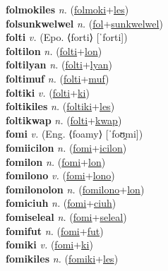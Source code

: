 \textbf{folmokiles} \textit{n.} (\hyperref[folmoki]{folmoki}+\hyperref[les]{les})
 \label{folmokiles} \\
\textbf{folsunkwelwel} \textit{n.} (\hyperref[fol]{fol}+\hyperref[sunkwelwel]{sunkwelwel})
 \label{folsunkwelwel} \\
\textbf{folti} \textit{v.} (Epo. ⟨forti⟩ [ˈforti])
 \label{folti} \\
\textbf{foltilon} \textit{n.} (\hyperref[folti]{folti}+\hyperref[lon]{lon})
 \label{foltilon} \\
\textbf{foltilyan} \textit{n.} (\hyperref[folti]{folti}+\hyperref[lyan]{lyan})
 \label{foltilyan} \\
\textbf{foltimuf} \textit{n.} (\hyperref[folti]{folti}+\hyperref[muf]{muf})
 \label{foltimuf} \\
\textbf{foltiki} \textit{v.} (\hyperref[folti]{folti}+\hyperref[ki]{ki})
 \label{foltiki} \\
\textbf{foltikiles} \textit{n.} (\hyperref[foltiki]{foltiki}+\hyperref[les]{les})
 \label{foltikiles} \\
\textbf{foltikwap} \textit{n.} (\hyperref[folti]{folti}+\hyperref[kwap]{kwap})
 \label{foltikwap} \\
\textbf{fomi} \textit{v.} (Eng. ⟨foamy⟩ [ˈfoʊ̯mi])
 \label{fomi} \\
\textbf{fomiicilon} \textit{n.} (\hyperref[fomi]{fomi}+\hyperref[icilon]{icilon})
 \label{fomiicilon} \\
\textbf{fomilon} \textit{n.} (\hyperref[fomi]{fomi}+\hyperref[lon]{lon})
 \label{fomilon} \\
\textbf{fomilono} \textit{v.} (\hyperref[fomi]{fomi}+\hyperref[lono]{lono})
 \label{fomilono} \\
\textbf{fomilonolon} \textit{n.} (\hyperref[fomilono]{fomilono}+\hyperref[lon]{lon})
 \label{fomilonolon} \\
\textbf{fomiciuh} \textit{n.} (\hyperref[fomi]{fomi}+\hyperref[ciuh]{ciuh})
 \label{fomiciuh} \\
\textbf{fomiseleal} \textit{n.} (\hyperref[fomi]{fomi}+\hyperref[seleal]{seleal})
 \label{fomiseleal} \\
\textbf{fomifut} \textit{n.} (\hyperref[fomi]{fomi}+\hyperref[fut]{fut})
 \label{fomifut} \\
\textbf{fomiki} \textit{v.} (\hyperref[fomi]{fomi}+\hyperref[ki]{ki})
 \label{fomiki} \\
\textbf{fomikiles} \textit{n.} (\hyperref[fomiki]{fomiki}+\hyperref[les]{les})
 \label{fomikiles} \\

